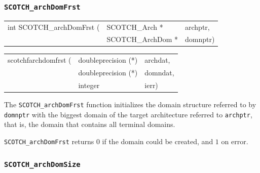 \subsubsection{{\tt SCOTCH\_archDomFrst}}

\begin{itemize}
\progsyn

{\tt\begin{tabular}{l@{}ll}
int SCOTCH\_archDomFrst ( & SCOTCH\_Arch *    & archptr, \\
                          & SCOTCH\_ArchDom * & domnptr) \\
\end{tabular}}

{\tt\begin{tabular}{l@{}ll}
scotchfarchdomfrst ( & doubleprecision (*) & archdat, \\
                     & doubleprecision (*) & domndat, \\
                     & integer             & ierr)
\end{tabular}}

\progdes

The {\tt SCOTCH\_archDomFrst} function initializes the domain
structure referred to by {\tt domnptr} with the biggest domain
of the target architecture referred to {\tt archptr}, that is, the
domain that contains all terminal domains.

\progret

{\tt SCOTCH\_archDomFrst} returns $0$ if the domain could be created,
and $1$ on error.
\end{itemize}

\subsubsection{{\tt SCOTCH\_archDomSize}}

